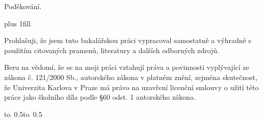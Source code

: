 \newpage



\openright

\noindent
\begin{otherlanguage}{czech}
Poděkování.
\end{otherlanguage}

\newpage


\vglue 0pt plus 1fill

\noindent
Prohlašuji, že jsem tuto bakalářskou práci vypracoval samostatně a výhradně s
použitím citovaných pramenů, literatury a dalších odborných zdrojů.

\medskip\noindent
Beru na vědomí, že se na moji práci vztahují práva a povinnosti vyplývající ze
zákona č. 121/2000 Sb., autorského zákona v platném znění, zejména skutečnost,
že Univerzita Karlova v Praze má právo na uzavření licenční smlouvy o užití
této práce jako školního díla podle \S 60 odst. 1 autorského zákona.

\vspace{10mm}

\hbox{\hbox to 0.5\hbox to 0.5}

\vspace{20mm}
\newpage


